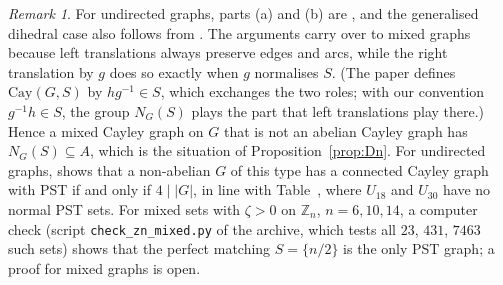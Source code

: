 \documentclass[preprint,11pt]{elsarticle}
\makeatletter
\theoremstyle{definition}
\theoremstyle{remark}
\newtheorem{remark}[theorem]{Remark}
\newcommand{\Z}{\mathbb Z}
\newcommand{\SR}[1]{\@nameuse{SR@#1}}
\makeatother
\begin{document}
\begin{remark}\label{rem:BAG}
For undirected graphs, parts (a) and (b) are \cite[Lemmas~5.1 and~5.2]{AG}, and the generalised dihedral case also follows from \cite{MS}. The arguments carry over to mixed graphs because left translations always preserve edges and arcs, while the right translation by $g$ does so exactly when $g$ normalises $S$. (The paper \cite{AG} defines $\mathrm{Cay}(G,S)$ by $hg^{-1}\in S$, which exchanges the two roles; with our convention $g^{-1}h\in S$, the group $N_G(S)$ plays the part that left translations play there.) Hence a mixed Cayley graph on $G$ that is not an abelian Cayley graph has $N_G(S)\subseteq A$, which is the situation of Proposition~\ref{prop:Dn}. For undirected graphs, \cite[Thm.~5.6]{AG} shows that a non-abelian $G$ of this type has a connected Cayley graph with PST if and only if $4\mid|G|$, in line with Table~\SR{tab:normal}, where $U_{18}$ and $U_{30}$ have no normal PST sets. For mixed sets with $\zeta>0$ on $\Z_n$, $n=6,10,14$, a computer check (script \texttt{check\_zn\_mixed.py} of the archive, which tests all $23$, $431$, $7463$ such sets) shows that the perfect matching $S=\{n/2\}$ is the only PST graph; a proof for mixed graphs is open.
\end{remark}
\end{document}
